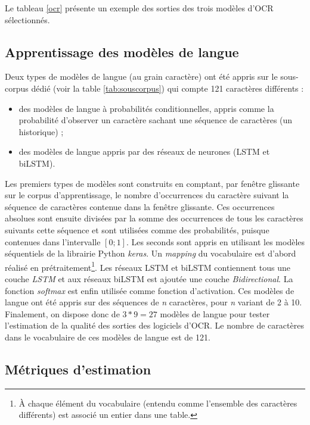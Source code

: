 \documentclass[10pt,twoside]{article}
\begin{document}
    Le tableau \ref{ocr} présente un exemple des sorties des trois modèles d'OCR sélectionnés.

    \subsection{Apprentissage des modèles de langue}
    Deux types de modèles de langue (au grain caractère) ont été appris sur le sous-corpus dédié (voir la table \ref{tab:souscorpus})
    qui compte 121 caractères différents :
    \begin{itemize}
      \item des modèles de langue à probabilités conditionnelles, appris comme la probabilité d'observer un caractère 
      sachant une séquence de caractères (un historique) ;
      \item des modèles de langue appris par des réseaux de neurones (LSTM et biLSTM).
    \end{itemize}
    Les premiers types de modèles sont construits en comptant, 
    par fenêtre glissante sur le corpus d'apprentissage, le nombre d'occurrences du caractère suivant
    la séquence de caractères contenue dans la fenêtre glissante. Ces occurrences absolues sont ensuite 
    divisées par la somme des occurrences de tous les caractères suivants cette séquence et sont utilisées
    comme des probabilités, puisque contenues dans l'intervalle $\left[0;1\right]$. Les seconds sont appris
    en utilisant les modèles séquentiels de la librairie Python \textit{keras}. Un \textit{mapping} du vocabulaire
    est d'abord réalisé en prétraitement\footnote{\`{A} chaque élément du vocabulaire (entendu comme l'ensemble des caractères 
    différents) est associé un entier dans une table.}. Les réseaux LSTM et biLSTM contiennent tous une couche 
    \textit{LSTM} et aux réseaux biLSTM est ajoutée une couche \textit{Bidirectional}. La fonction \textit{softmax} est 
    enfin utilisée comme fonction d'activation. Ces modèles de langue ont été appris sur des séquences de \textit{n} 
    caractères, pour \textit{n} variant de 2 à 10. Finalement, on dispose donc de $3 * 9 = 27$ modèles de langue
    pour tester l'estimation de la qualité des sorties des logiciels d'OCR. Le nombre de caractères dans le vocabulaire de ces
    modèles de langue est de 121.

    \subsection{Métriques d'estimation}\label{metric}
\end{document}

